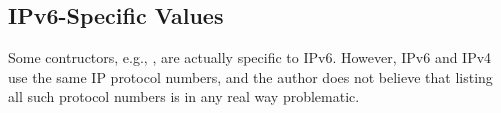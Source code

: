 \documentclass{report}
\begin{document}
\subsection{IPv6-Specific Values}
Some  contructors, e.g., , are actually specific to IPv6.  However, IPv6 and IPv4 use the same IP protocol numbers, and the author does not believe that listing all such protocol numbers is in any real way problematic.
\end{document}
